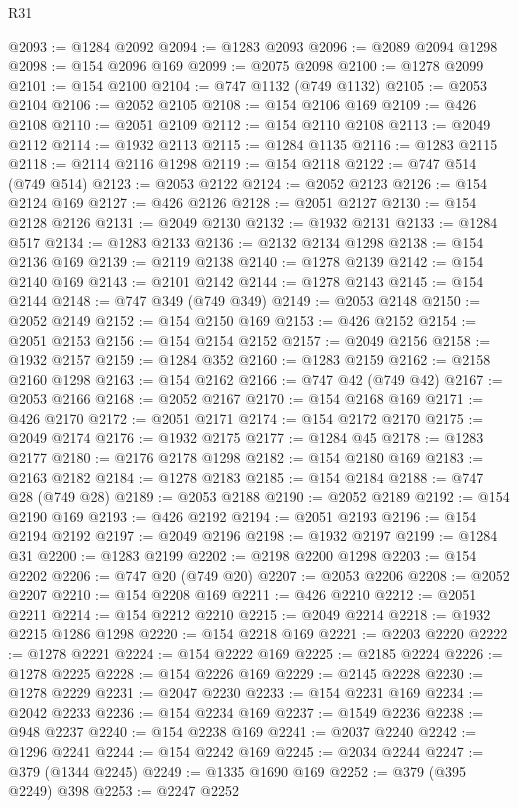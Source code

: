 \begin{lexlean}{R31}
\begin{coremodule}
@2093 := @1284 @2092
@2094 := @1283 @2093
@2096 := @2089 @2094 @1298
@2098 := @154 @2096 @169
@2099 := @2075 @2098
@2100 := @1278 @2099
@2101 := @154 @2100
@2104 := @747 @1132 (@749 @1132)
@2105 := @2053 @2104
@2106 := @2052 @2105
@2108 := @154 @2106 @169
@2109 := @426 @2108
@2110 := @2051 @2109
@2112 := @154 @2110 @2108
@2113 := @2049 @2112
@2114 := @1932 @2113
@2115 := @1284 @1135
@2116 := @1283 @2115
@2118 := @2114 @2116 @1298
@2119 := @154 @2118
@2122 := @747 @514 (@749 @514)
@2123 := @2053 @2122
@2124 := @2052 @2123
@2126 := @154 @2124 @169
@2127 := @426 @2126
@2128 := @2051 @2127
@2130 := @154 @2128 @2126
@2131 := @2049 @2130
@2132 := @1932 @2131
@2133 := @1284 @517
@2134 := @1283 @2133
@2136 := @2132 @2134 @1298
@2138 := @154 @2136 @169
@2139 := @2119 @2138
@2140 := @1278 @2139
@2142 := @154 @2140 @169
@2143 := @2101 @2142
@2144 := @1278 @2143
@2145 := @154 @2144
@2148 := @747 @349 (@749 @349)
@2149 := @2053 @2148
@2150 := @2052 @2149
@2152 := @154 @2150 @169
@2153 := @426 @2152
@2154 := @2051 @2153
@2156 := @154 @2154 @2152
@2157 := @2049 @2156
@2158 := @1932 @2157
@2159 := @1284 @352
@2160 := @1283 @2159
@2162 := @2158 @2160 @1298
@2163 := @154 @2162
@2166 := @747 @42 (@749 @42)
@2167 := @2053 @2166
@2168 := @2052 @2167
@2170 := @154 @2168 @169
@2171 := @426 @2170
@2172 := @2051 @2171
@2174 := @154 @2172 @2170
@2175 := @2049 @2174
@2176 := @1932 @2175
@2177 := @1284 @45
@2178 := @1283 @2177
@2180 := @2176 @2178 @1298
@2182 := @154 @2180 @169
@2183 := @2163 @2182
@2184 := @1278 @2183
@2185 := @154 @2184
@2188 := @747 @28 (@749 @28)
@2189 := @2053 @2188
@2190 := @2052 @2189
@2192 := @154 @2190 @169
@2193 := @426 @2192
@2194 := @2051 @2193
@2196 := @154 @2194 @2192
@2197 := @2049 @2196
@2198 := @1932 @2197
@2199 := @1284 @31
@2200 := @1283 @2199
@2202 := @2198 @2200 @1298
@2203 := @154 @2202
@2206 := @747 @20 (@749 @20)
@2207 := @2053 @2206
@2208 := @2052 @2207
@2210 := @154 @2208 @169
@2211 := @426 @2210
@2212 := @2051 @2211
@2214 := @154 @2212 @2210
@2215 := @2049 @2214
@2218 := @1932 @2215 @1286 @1298
@2220 := @154 @2218 @169
@2221 := @2203 @2220
@2222 := @1278 @2221
@2224 := @154 @2222 @169
@2225 := @2185 @2224
@2226 := @1278 @2225
@2228 := @154 @2226 @169
@2229 := @2145 @2228
@2230 := @1278 @2229
@2231 := @2047 @2230
@2233 := @154 @2231 @169
@2234 := @2042 @2233
@2236 := @154 @2234 @169
@2237 := @1549 @2236
@2238 := @948 @2237
@2240 := @154 @2238 @169
@2241 := @2037 @2240
@2242 := @1296 @2241
@2244 := @154 @2242 @169
@2245 := @2034 @2244
@2247 := @379 (@1344 @2245)
@2249 := @1335 @1690 @169
@2252 := @379 (@395 @2249) @398
@2253 := @2247 @2252

\end{coremodule}
\end{lexlean}
